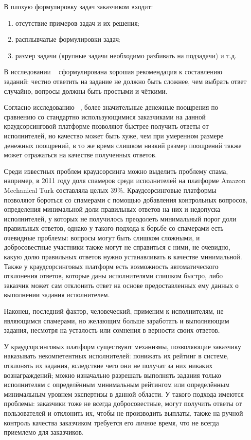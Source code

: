 \documentclass[specification,annotation,times]{itmo-student-thesis}
\begin{document}
В плохую формулировку задач заказчиком входит:
\begin{enumerate}
    \item отсутствие примеров задач и их решения;
    \item расплывчатые формулировки задач;
    \item размер задачи (крупные задачи необходимо разбивать на подзадачи) и т.д.
\end{enumerate}

В исследовании ~\cite{allahbakhsh2013quality} сформулирована хорошая рекомендация к составлению заданий: честно ответить на задание не должно быть сложнее, чем выбрать ответ случайно, вопросы должны быть простыми и чёткими.

Согласно исследованию ~\cite{mason2009financial}, более значительные денежные поощрения по сравнению со стандартно использующимися заказчиками на данной краудсорсинговой платформе позволяют быстрее получить ответы от исполнителей, но качество может быть хуже, чем при умеренном размере денежных поощрений, в то же время слишком низкий размер поощрений также может отражаться на качестве полученных ответов.

Среди известных проблем краудсорсинга можно выделить проблему спама, например, в 2011 году доля спамеров среди исполнителей на платформе Amazon Mechanical Turk составляла целых 39\%. Краудсорсинговые платформы позволяют бороться со спамерами с помощью добавления контрольных вопросов, определения минимальной доли правильных ответов на них и недопуска исполнителей, у которых не получилось преодолеть минимальный порог доли правильных ответов, однако у такого подхода к борьбе со спамерами есть очевидные проблемы: вопросы могут быть слишком сложными, и добросовестные участники также могут не справиться с ними, не очевидно, какую долю правильных ответов нужно устанавливать в качестве минимальной. Также у краудсорсинговых платформ есть возможность автоматического отклонения ответов, которые даны исполнителями слишком быстро, либо заказчик может сам отклонить ответ на основе предоставленных ему данных о выполнении задания исполнителем.

Наконец, последний фактор, человеческий, применим к исполнителям, не являющимся спамерами, но желающим больше заработать и выполняющим задания, несмотря на усталость или сомнения в верности своих ответов.

У краудсорсинговых платформ существуют механизмы, позволяющие заказчику наказывать некомпетентных исполнителей: понижать их рейтинг в системе, отклонять их задания, вследствие чего они не получат за них никаких вознаграждений; можно изначально разрешать выполнять задания только исполнителям с определённым минимальным рейтингом или определённым минимальным уровнем экспертизы в данной области. У такого подхода имеются проблемы: заказчики тоже не всегда добросовестные, могут получить ответы от пользователей и отклонить их, чтобы не производить выплаты, также на ручной контроль качества заказчиком требуется его личное время, что не всегда приемлемо для заказчиков. 
\end{document}
